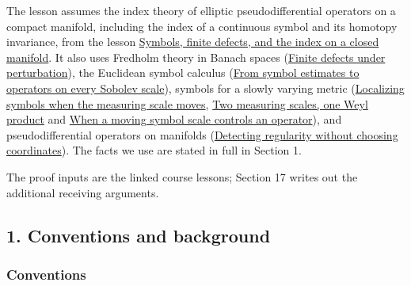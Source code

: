 \documentclass[
  11pt,
]{article}
\begin{document}
The lesson assumes the index theory of elliptic pseudodifferential
operators on a compact manifold, including the index of a continuous
symbol and its homotopy invariance, from the lesson
\href{global-elliptic-symbol-index.pdf}{Symbols, finite defects, and the
index on a closed manifold}. It also uses Fredholm theory in Banach
spaces (\href{fredholm-stability.pdf}{Finite defects under
perturbation}), the Euclidean symbol calculus
(\href{euclidean-symbol-calculus.pdf}{From symbol estimates to operators
on every Sobolev scale}), symbols for a slowly varying metric
(\href{metric-localization.pdf}{Localizing symbols when the measuring
scale moves}, \href{weyl-metric-products.pdf}{Two measuring scales, one
Weyl product} and \href{metric-operator-bounds.pdf}{When a moving symbol
scale controls an operator}), and pseudodifferential operators on
manifolds (\href{geometric-microlocal-calculus.pdf}{Detecting regularity
without choosing coordinates}). The facts we use are stated in full in
Section 1.

The proof inputs are the linked course lessons; Section 17 writes out
the additional receiving arguments.

\subsection{1. Conventions and
background}\label{conventions-and-background}

\subsubsection{Conventions}\label{conventions}
\end{document}
